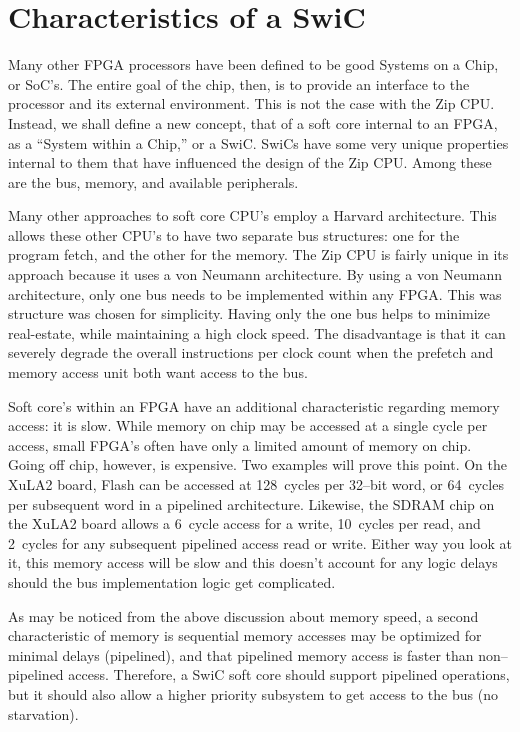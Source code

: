 \documentclass{gqtekspec}
\begin{document}
\section{Characteristics of a SwiC}

Many other FPGA processors have been defined to be good Systems on a Chip, or 
SoC's.  The entire goal of the chip, then, is to provide an interface to the
processor and its external environment.  This is not the case with the Zip
CPU.  Instead, we shall define a new concept, that of a soft core internal to
an FPGA, as a ``System within a Chip,'' or a SwiC.  SwiCs have some very
unique properties internal to them that have influenced the design of the
Zip CPU.  Among these are the bus, memory, and available peripherals.

Many other approaches to soft core CPU's employ a Harvard architecture. 
This allows these other CPU's to have two separate bus structures: one for the
program fetch, and the other for the memory.  The Zip CPU is fairly unique in
its approach because it uses a von Neumann architecture. 
By using a von Neumann architecture, only one bus needs to be implemented
within any FPGA.  This was structure was chosen for simplicity. 
Having only the one bus helps to minimize real-estate, while
maintaining a high clock speed.  The disadvantage is that it can severely
degrade the overall instructions per clock count when the prefetch and
memory access unit both want access to the bus.

Soft core's within an FPGA have an additional characteristic regarding
memory access: it is slow.  While memory on chip may be accessed at a single
cycle per access, small FPGA's often have only a limited amount of memory on
chip.  Going off chip, however, is expensive.  Two examples will prove this
point.  On
the XuLA2 board, Flash can be accessed at 128~cycles per 32--bit word,
or 64~cycles per subsequent word in a pipelined architecture.  Likewise, the
SDRAM chip on the XuLA2 board allows a 6~cycle access for a write, 10~cycles
per read, and 2~cycles for any subsequent pipelined access read or write.
Either way you look at it, this memory access will be slow and this doesn't
account for any logic delays should the bus implementation logic get
complicated.

As may be noticed from the above discussion about memory speed, a second
characteristic of memory is sequential memory accesses may be optimized for
minimal delays (pipelined), and that pipelined memory access is faster than
non--pipelined access.  Therefore, a SwiC soft core should support pipelined
operations, but it should also allow a higher priority subsystem to get access
to the bus (no starvation).
\end{document}
